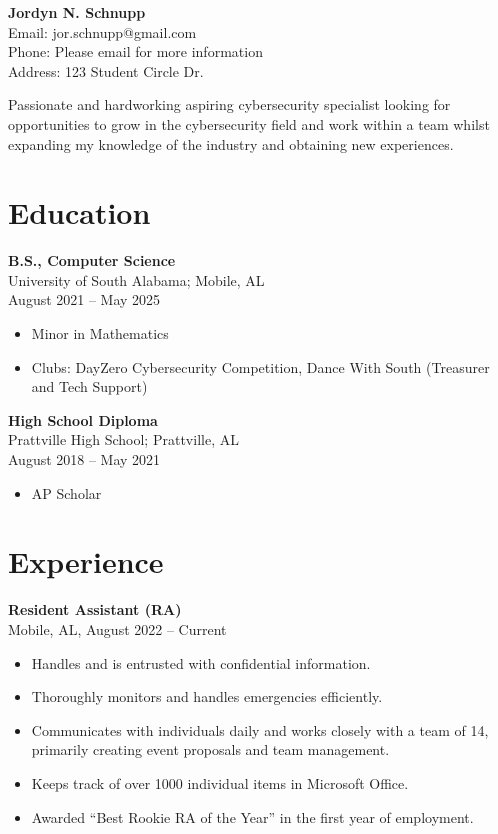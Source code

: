 \documentclass[letterpaper,10pt]{article}
\begin{document}
\pagestyle{empty} %

\begin{center}
    {\LARGE \textbf{Jordyn N. Schnupp}} \\
    Email: jor.schnupp@gmail.com \\
    Phone: Please email for more information \\
    Address: 123 Student Circle Dr.
\end{center}

\noindent
Passionate and hardworking aspiring cybersecurity specialist looking for opportunities to grow in the cybersecurity field and work within a team whilst expanding my knowledge of the industry and obtaining new experiences.

\section*{Education}

\noindent
\textbf{B.S., Computer Science} \\
University of South Alabama; Mobile, AL \\
August 2021 – May 2025 \\
\begin{itemize}
    \item Minor in Mathematics
    \item Clubs: DayZero Cybersecurity Competition, Dance With South (Treasurer and Tech Support)
\end{itemize}

\noindent
\textbf{High School Diploma} \\
Prattville High School; Prattville, AL \\
August 2018 – May 2021 \\
\begin{itemize}
    \item AP Scholar
\end{itemize}

\section*{Experience}

\noindent
\textbf{Resident Assistant (RA)} \\
Mobile, AL, August 2022 – Current
\begin{itemize}
    \item Handles and is entrusted with confidential information.
    \item Thoroughly monitors and handles emergencies efficiently.
    \item Communicates with individuals daily and works closely with a team of 14, primarily creating event proposals and team management.
    \item Keeps track of over 1000 individual items in Microsoft Office.
    \item Awarded “Best Rookie RA of the Year” in the first year of employment.
\end{itemize}
\end{document}

